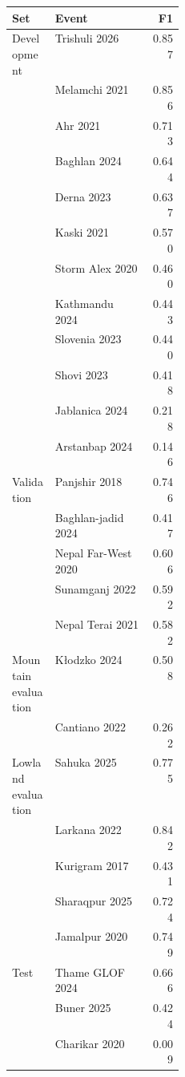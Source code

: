 \documentclass[10pt,twocolumn,letterpaper]{article}
\begin{document}
\par\noindent\begin{minipage}{\linewidth}
\label{tab:event-scores}
\fontsize{8.2}{9.6}\selectfont
\begin{tabularx}{\linewidth}{@{}P{0.25\linewidth}Lr@{}}
\toprule
Set & Event & F1 \\
\midrule
Development & Trishuli 2026 & 0.857 \\
 & Melamchi 2021 & 0.856 \\
 & Ahr 2021 & 0.713 \\
 & Baghlan 2024 & 0.644 \\
 & Derna 2023 & 0.637 \\
 & Kaski 2021 & 0.570 \\
 & Storm Alex 2020 & 0.460 \\
 & Kathmandu 2024 & 0.443 \\
 & Slovenia 2023 & 0.440 \\
 & Shovi 2023 & 0.418 \\
 & Jablanica 2024 & 0.218 \\
 & Arstanbap 2024 & 0.146 \\
\addlinespace
Validation & Panjshir 2018 & 0.746 \\
 & Baghlan-jadid 2024 & 0.417 \\
 & Nepal Far-West 2020 & 0.606 \\
 & Sunamganj 2022 & 0.592 \\
 & Nepal Terai 2021 & 0.582 \\
\addlinespace
Mountain evaluation & K\l{}odzko 2024 & 0.508 \\
 & Cantiano 2022 & 0.262 \\
\addlinespace
Lowland evaluation & Sahuka 2025 & 0.775 \\
 & Larkana 2022 & 0.842 \\
 & Kurigram 2017 & 0.431 \\
 & Sharaqpur 2025 & 0.724 \\
 & Jamalpur 2020 & 0.749 \\
\addlinespace
Test & Thame GLOF 2024 & 0.666 \\*
 & Buner 2025 & 0.424 \\*
 & Charikar 2020 & 0.009 \\
\bottomrule
\end{tabularx}
\end{minipage}\par\vspace{8pt}
\end{document}
